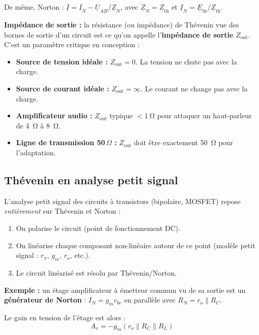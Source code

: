 \documentclass[12pt,a4paper,twoside]{book}
\begin{document}
De même, Norton : $\underline{I} = \underline{I}_N - \underline{U}_{AB}/\underline{Z}_N$, avec $\underline{Z}_N = \underline{Z}_{\text{th}}$ et $\underline{I}_N = \underline{E}_{\text{th}}/\underline{Z}_{\text{th}}$.

\begin{pratique}
\textbf{Impédance de sortie :} la résistance (ou impédance) de Thévenin vue des bornes de sortie d'un circuit est ce qu'on appelle l'\textbf{impédance de sortie} $Z_{\text{out}}$. C'est un paramètre critique en conception :
\begin{itemize}[nosep]
\item \textbf{Source de tension idéale :} $Z_{\text{out}} = 0$. La tension ne chute pas avec la charge.
\item \textbf{Source de courant idéale :} $Z_{\text{out}} = \infty$. Le courant ne change pas avec la charge.
\item \textbf{Amplificateur audio :} $Z_{\text{out}}$ typique $< \SI{1}{\ohm}$ pour attaquer un haut-parleur de \SI{4}{\ohm} à \SI{8}{\ohm}.
\item \textbf{Ligne de transmission 50\,$\Omega$ :} $Z_{\text{out}}$ doit être exactement \SI{50}{\ohm} pour l'adaptation.
\end{itemize}
\end{pratique}

\subsection{Thévenin en analyse petit signal}

L'analyse petit signal des circuits à transistors (bipolaire, MOSFET) repose \textit{entièrement} sur Thévenin et Norton :

\begin{enumerate}[nosep]
\item On polarise le circuit (point de fonctionnement DC).
\item On linéarise chaque composant non-linéaire autour de ce point (modèle petit signal : $r_\pi$, $g_m$, $r_o$, etc.).
\item Le circuit linéarisé est résolu par Thévenin/Norton.
\end{enumerate}

\textbf{Exemple :} un étage amplificateur à émetteur commun vu de sa sortie est un \textbf{générateur de Norton} : $I_N = g_m v_{be}$ en parallèle avec $R_N = r_o \parallel R_C$.

Le gain en tension de l'étage est alors :
\[
A_v = -g_m (r_o \parallel R_C \parallel R_L)
\]
\end{document}

